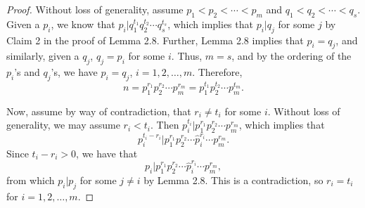 \documentclass[english,course]{lecture}
\newenvironment{hint}{\startimportant}{}
\def\startimportant#1\end{[{Hint:} #1]\end}
\theoremstyle{plain}
\def\set#1{\left\{ {#1} \right\}}
\begin{document}

\begin{proof}
	Without loss of generality, assume $p_1 < p_2 < \cdots < p_m$ and $q_1 < q_2 < \cdots < q_s$.
	Given a $p_i$, we know that $p_i | q_1^{t_1} q_2^{t_2} \cdots q_s^{t_s}$, which implies that $p_i | q_j$ for some $j$ by Claim 2 in the proof of Lemma 2.8.
	Further, Lemma 2.8 implies that $p_i = q_j$, and similarly, given a $q_j$, $q_j = p_i$ for some $i$.
	Thus, $m =s$, and by the ordering of the $p_i$'s and $q_j$'s, we have $p_i = q_j$, $i = 1, 2, \ldots, m$.
	Therefore, 
	\[
		n = p_1^{r_1} p_2^{r_2} \cdots p_m^{r_m} = p_1^{t_1} p_2^{t_2} \cdots p_m^{t_m}.
	\]
	
	Now, assume by way of contradiction, that $r_i \ne t_i$ for some $i$.
	Without loss of generality, we may assume $r_i < t_i$.
	Then $p_i^{t_i} | p_1^{r_1} p_2^{r_2} \cdots p_m^{r_m}$, which implies that 
	\[
		p_i^{t_i - r_i} | p_1^{r_1} p_2^{r_2} \cdots \hat{p}_i^{r_i} \cdots p_m^{r_m}.
	\]
	Since $t_i - r_i > 0$, we have that
	\[
		p_i  | p_1^{r_1} p_2^{r_2} \cdots \hat{p}_i^{r_i} \cdots p_m^{r_m},
	\]
	from which $p_i | p_j$ for some $j\ne i$ by Lemma 2.8. This is a contradiction, so $r_i = t_i$ for $i = 1, 2, \ldots, m$.
\end{proof}
\end{document}
